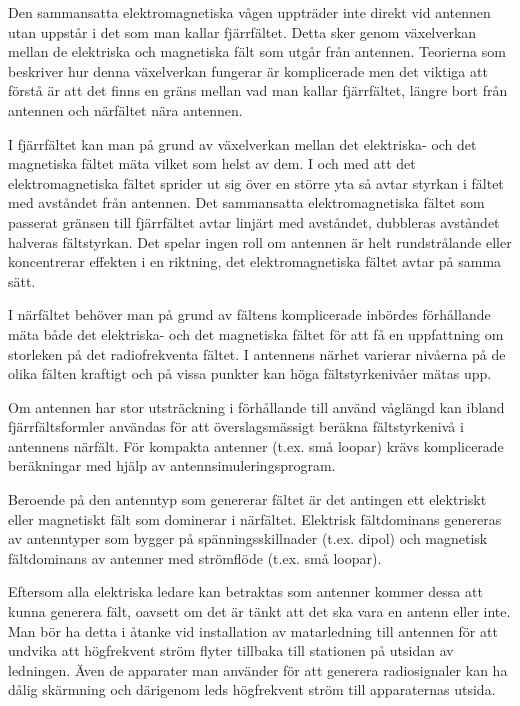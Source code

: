 Den sammansatta elektromagnetiska vågen uppträder inte direkt vid antennen utan
uppstår i det som man kallar fjärrfältet.
Detta sker genom växelverkan mellan de elektriska och magnetiska fält som
utgår från antennen.
Teorierna som beskriver hur denna växelverkan fungerar är komplicerade
men det viktiga att förstå är att det finns en gräns mellan vad man
kallar fjärrfältet, längre bort från antennen och närfältet nära antennen.

I fjärrfältet kan man på grund av växelverkan mellan det elektriska- och det
magnetiska fältet mäta vilket som helst av dem.
I och med att det elektromagnetiska fältet sprider ut sig över en större yta så
avtar styrkan i fältet med avståndet från antennen.
Det sammansatta elektromagnetiska fältet som passerat gränsen till fjärrfältet
avtar linjärt med avståndet, dubbleras avståndet halveras fältstyrkan.
Det spelar ingen roll om antennen är helt rundstrålande eller koncentrerar
effekten i en riktning, det elektromagnetiska fältet avtar på samma sätt.

I närfältet behöver man på grund av fältens komplicerade inbördes förhållande
mäta både det elektriska- och det magnetiska fältet för att få en uppfattning
om storleken på det radiofrekventa fältet.
I antennens närhet varierar nivåerna på de olika fälten kraftigt och på vissa
punkter kan höga fältstyrkenivåer mätas upp.

Om antennen har stor utsträckning i förhållande till använd våglängd kan ibland
fjärrfältsformler användas för att överslagsmässigt beräkna fältstyrkenivå i
antennens närfält.
För kompakta antenner (t.ex. små loopar) krävs komplicerade beräkningar
med hjälp av antennsimuleringsprogram.

Beroende på den antenntyp som genererar fältet är det antingen ett elektriskt
eller magnetiskt fält som dominerar i närfältet.
Elektrisk fältdominans genereras av antenntyper som bygger på
spänningsskillnader (t.ex. dipol) och magnetisk fältdominans av antenner
med strömflöde (t.ex. små loopar).

Eftersom alla elektriska ledare kan betraktas som antenner kommer dessa att
kunna generera fält, oavsett om det är tänkt att det ska vara en antenn eller
inte.
Man bör ha detta i åtanke vid installation av matarledning till antennen för
att undvika att högfrekvent ström flyter tillbaka till stationen på utsidan av
ledningen.
Även de apparater man använder för att generera radiosignaler kan ha dålig
skärmning och därigenom leds högfrekvent ström till apparaternas utsida.

